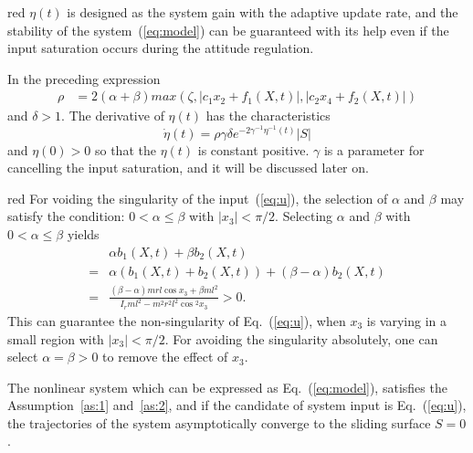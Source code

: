 \begin{color}{red}
$\eta(t)$ is designed as the system gain with the adaptive update rate, and the stability of the system~(\ref{eq:model}) can be guaranteed with its help even if the input saturation occurs during the attitude regulation.
\end{color}
In the preceding expression
\begin{align}
\rho &= 2(\alpha+\beta)max(\zeta,\vert c_1x_2+f_1(X,t)\vert,\vert c_2x_4+f_2(X,t)\vert)
\end{align}
and $\delta>1$. The derivative of $\eta(t)$ has the characteristics $$\dot{{\eta}}(t) = \rho\gamma\delta e^{-2\gamma^{-1}{\eta}^{-1}(t)}\vert S\vert$$ and $\eta(0) > 0$ so that the $\eta(t)$ is constant positive. $\gamma$ is a parameter for cancelling the input saturation, and it will be discussed later on. \begin{color}{red}
For voiding the singularity of the input~(\ref{eq:u}), the selection of $\alpha$ and $\beta$ may satisfy the condition: $0<\alpha\le\beta$ with $\vert x_3\vert<\pi/2$.
    Selecting $\alpha$ and $\beta$ with $0<\alpha\le\beta$ yields
    \begin{align*}
    &\alpha b_1(X,t)+\beta b_2(X,t)\\
    =& \alpha(b_1(X,t)+b_2(X,t))+(\beta-\alpha)b_2(X,t)\\
    =&\frac{(\beta-\alpha)mrl\cos x_3 + \beta ml^2}{I_rml^2-m^2r^2l^2\cos{^2x_3}}>0.
    \end{align*}
    This can guarantee the non-singularity of Eq.~(\ref{eq:u}), when $x_3$ is varying in a small region with $\vert x_3\vert<\pi/2$. For avoiding the singularity absolutely, one can select $\alpha = \beta >0$ to remove the effect of $x_3$.
\end{color}
\begin{theorem}
The nonlinear system which can be expressed as Eq.~(\ref{eq:model}), satisfies the Assumption~\ref{as:1} and~\ref{as:2}, and if the candidate of system input is Eq.~(\ref{eq:u}), the trajectories of the system asymptotically converge to the sliding surface $S = 0$.
\end{theorem}
